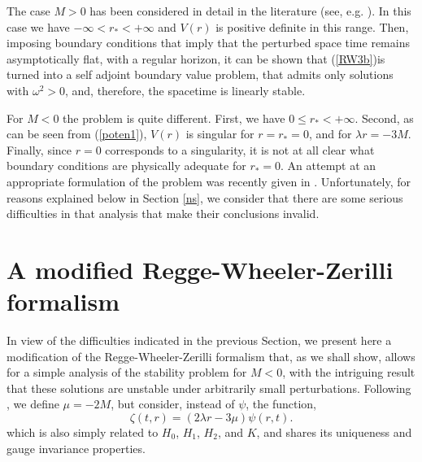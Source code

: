 \documentclass[12pt,aps,floats,showpacs,amssymb,tightenlines]{revtex4}
\begin{document}
The case $M >0$ has been considered in detail in the literature
(see, e.g. \cite{chandra}). In this case we have $-\infty < r_* <
+\infty$ and $V(r)$ is positive definite in this range. Then,
 imposing boundary conditions that imply that the perturbed space time remains asymptotically flat,
  with a regular horizon, it can be shown that (\ref{RW3b})is turned into a self adjoint boundary
  value problem, that admits only solutions with $\omega^2 >0$, and, therefore, the spacetime is
  linearly stable.

For $M<0$ the problem is quite different. First, we have $0 \leq r_* < +\infty$.
 Second, as can be seen from (\ref{poten1}), $V(r)$ is singular for $r=r_*=0$,
 and for $\lambda r = -3 M$. Finally, since $r=0$ corresponds to a singularity,
 it is not at all clear what boundary conditions are physically adequate
 for $r_*=0$. An attempt at an appropriate formulation of the problem was recently
 given in \cite{ghi}. Unfortunately, for reasons explained below in Section \ref{ns}, we consider
 that there are some serious difficulties in that analysis that make their conclusions invalid.

\section{A modified Regge-Wheeler-Zerilli formalism}
\label{rwzg}

In view of the difficulties indicated in the previous Section, we present here a modification
of the Regge-Wheeler-Zerilli formalism that, as we shall show, allows for a simple analysis of
 the stability problem for $M<0$, with the intriguing result that these solutions are unstable
 under arbitrarily small perturbations.  Following \cite{ghi}, we define $\mu = -2M$, but consider,
 instead of $\psi$, the function,
\begin{equation}
\label{AppB1}
\zeta(t,r)= (2\lambda r -3 \mu ) \psi(r,t).
\end{equation}
which is also simply related to $H_0$, $H_1$, $H_2$, and $K$, and shares its uniqueness and gauge
 invariance properties.
\end{document}
